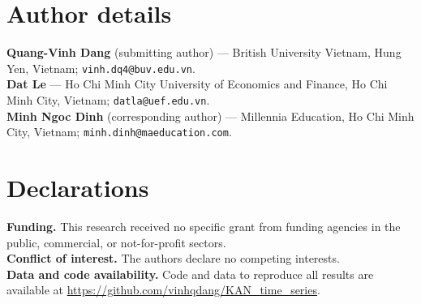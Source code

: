 \documentclass[preprint,12pt,authoryear]{elsarticle}
\begin{document}
\section*{Author details}
\noindent\textbf{Quang-Vinh Dang} (submitting author) --- British University
Vietnam, Hung Yen, Vietnam; \texttt{vinh.dq4@buv.edu.vn}.\\
\textbf{Dat Le} --- Ho Chi Minh City University of Economics and Finance, Ho Chi
Minh City, Vietnam; \texttt{datla@uef.edu.vn}.\\
\textbf{Minh Ngoc Dinh} (corresponding author) --- Millennia Education, Ho Chi Minh City, Vietnam;
\texttt{minh.dinh@maeducation.com}.

\section*{Declarations}
\noindent\textbf{Funding.} This research received no specific grant from funding
agencies in the public, commercial, or not-for-profit sectors.
\\
\textbf{Conflict of interest.} The authors declare no competing interests.\\
\textbf{Data and code availability.} Code and data to reproduce all results are
available at \url{https://github.com/vinhqdang/KAN_time_series}.
\end{document}
